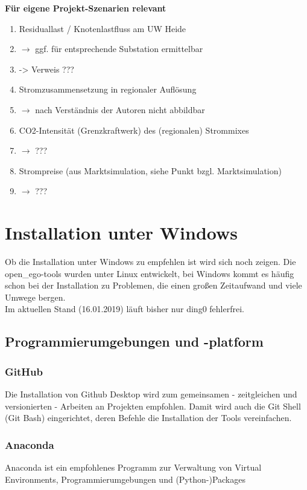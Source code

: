 \documentclass[
a4paper,     %
12pt         %
]{scrartcl}  %
\begin{document}
\textbf{Für eigene Projekt-Szenarien relevant}
\begin{enumerate}
	\item Residuallast / Knotenlastfluss am UW Heide
	\item[] $\rightarrow$ ggf. für entsprechende Substation ermittelbar
	\item[] -> Verweis ???

	\item Stromzusammensetzung in regionaler Auflösung
	\item[] $\rightarrow$ nach Verständnis der Autoren nicht abbildbar
	\item  CO2-Intensität (Grenzkraftwerk) des (regionalen) Strommixes
	\item[] $\rightarrow$ ???
	\item Strompreise (aus Marktsimulation, siehe Punkt bzgl. Marktsimulation)
	\item[] $\rightarrow$ ???



\end{enumerate}

\section{Installation unter Windows}
Ob die Installation unter Windows zu empfehlen ist wird sich noch zeigen. Die open\_ego-tools wurden unter Linux entwickelt, bei Windows kommt es häufig schon bei der Installation zu Problemen, die einen gro{\ss}en Zeitaufwand und viele Umwege bergen.\\
Im aktuellen Stand (16.01.2019) l\"auft bisher nur ding0 fehlerfrei.

\subsection{Programmierumgebungen und -platform}
\subsubsection{GitHub}
Die Installation von Github Desktop wird zum gemeinsamen - zeitgleichen und versionierten - Arbeiten an Projekten empfohlen. Damit wird auch die Git Shell (Git Bash) eingerichtet, deren Befehle die Installation der Tools vereinfachen.

\subsubsection{Anaconda}
Anaconda ist ein empfohlenes Programm zur Verwaltung von Virtual Environments, Programmierumgebungen und (Python-)Packages
\end{document}
